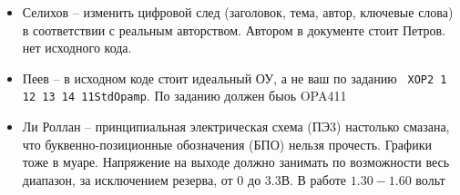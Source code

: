 \begin{itemize}
\item Селихов -- изменить цифровой след (заголовок, тема, автор, ключевые слова) в соответствии с реальным авторством. Автором в документе стоит Петров. нет исходного кода.

\item Пеев -- в исходном коде стоит идеальный ОУ, а не ваш по заданию
\texttt{ XOP2         1 12 13 14 11StdOpamp}. По заданию должен быоь OPA411
\item  Ли Роллан -- принципиальная электрическая схема (ПЭ3) настолько смазана, что буквенно-позиционные обозначения (БПО) нельзя прочесть. Графики тоже в муаре. 
Напряжение на выходе должно занимать по возможности весь диапазон, за исключением резерва, от 0 до 3.3В. В работе $1.30-1.60$ вольт
\end{itemize}




